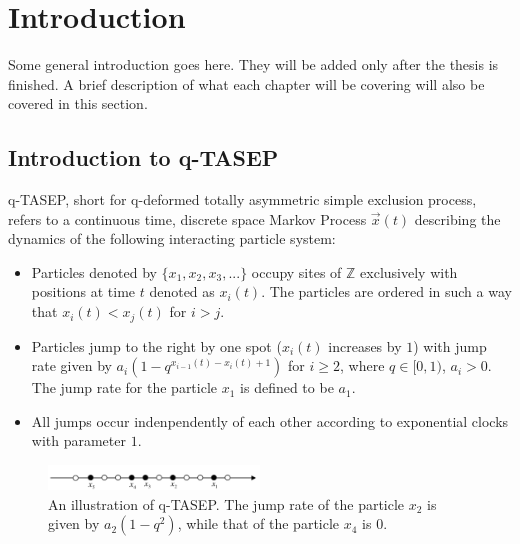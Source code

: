 \chapter{Introduction}
Some general introduction goes here. They will be added only after the thesis is finished. 
A brief description of what each chapter will be covering will also be covered in this section. 

\section{Introduction to q-TASEP}
\label{sec:intro-qtasep}

q-TASEP, short for q-deformed totally asymmetric simple exclusion process, refers to a continuous time, discrete space Markov Process $\vec{x}(t)$ describing the dynamics of the following interacting particle system:

\begin{itemize}
\item Particles denoted by $\{x_1, x_2, x_3, ...\}$ occupy sites of $\mathbb{Z}$ exclusively with positions at time $t$ denoted as $x_i(t)$. The particles are ordered in such a way that $x_i(t) < x_j(t)$ for $i > j$.
\item Particles jump to the right by one spot ($x_i(t)$ increases by $1$) with jump rate given by $a_i (1-q^{x_{i-1}(t)-x_i(t)+1})$ for $i \ge 2$, where $q \in [0,1)$, $a_i > 0$. The jump rate for the particle $x_1$ is defined to be $a_1$.
\item All jumps occur indenpendently of each other according to exponential clocks with parameter $1$.
\end{itemize}

\begin{figure}
	\centering
	\includegraphics[width=0.5\textwidth]{q-TASEP}
	\caption[An illustration of q-TASEP]
	{An illustration of q-TASEP. The jump rate of the particle $x_2$ is given by $a_2(1-q^2)$, while that of the particle $x_4$ is $0$.}
	\label{fig:q-TASEP}
\end{figure}

